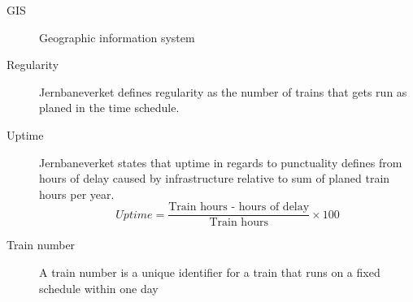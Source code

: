 \label{sec:abbriv}
\vspace{5mm}

\begin{description}
\item [GIS] Geographic information system
\item [Regularity]	Jernbaneverket defines regularity as the number of trains that gets run as planed in the time schedule. 
\item [Uptime]	Jernbaneverket states that uptime in regards to punctuality defines from hours of delay caused by infrastructure relative to sum of planed train hours per year. \begin{equation} Uptime =
\frac{\text{Train hours - hours of delay}}{\text{Train hours}}\times 100 \end{equation}
\item [Train number] A train number is a unique identifier for a train that 
runs on a fixed schedule within one day
\end{description}


